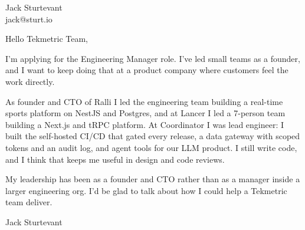 \documentclass[11pt]{article}
\begin{document}
\raggedright

{\namefont\fontsize{20pt}{24pt}\selectfont Jack Sturtevant}\\[-0.3em]
jack@sturt.io

\vspace{1.2em}

Hello Tekmetric Team,

I'm applying for the Engineering Manager role. I've led small teams as a founder, and I want to keep doing that at a product company where customers feel the work directly.

As founder and CTO of Ralli I led the engineering team building a real-time sports platform on NestJS and Postgres, and at Lancer I led a 7-person team building a Next.js and tRPC platform. At Coordinator I was lead engineer: I built the self-hosted CI/CD that gated every release, a data gateway with scoped tokens and an audit log, and agent tools for our LLM product. I still write code, and I think that keeps me useful in design and code reviews.

My leadership has been as a founder and CTO rather than as a manager inside a larger engineering org. I'd be glad to talk about how I could help a Tekmetric team deliver.

\vspace{0.6em}
Jack Sturtevant
\end{document}

